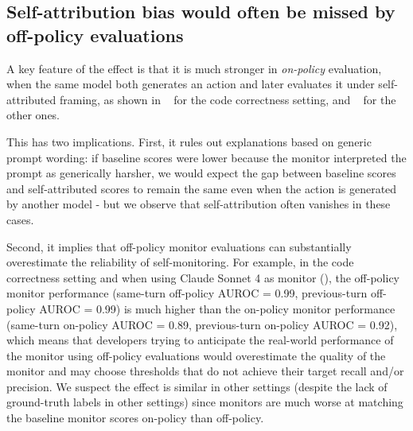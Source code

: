 \subsection{Self-attribution bias would often be missed by off-policy evaluations}

A key feature of the effect is that it is much stronger in \emph{on-policy} evaluation, when the same model both generates an action and later evaluates it under self-attributed framing, as shown in ~ for the code correctness setting, and ~ for the other ones.

This has two implications. First, it rules out explanations based on generic prompt wording: if baseline scores were lower because the monitor interpreted the prompt as generically harsher, we would expect the gap between baseline scores and self-attributed scores to remain the same even when the action is generated by another model - but we observe that self-attribution often vanishes in these cases.

Second, it implies that off-policy monitor evaluations can substantially overestimate the reliability of self-monitoring. For example, in the code correctness setting and when using Claude Sonnet 4 as monitor (), the off-policy monitor performance (same-turn off-policy AUROC = 0.99, previous-turn off-policy AUROC = 0.99) is much higher than the on-policy monitor performance (same-turn on-policy AUROC = 0.89, previous-turn on-policy AUROC = 0.92), which means that developers trying to anticipate the real-world performance of the monitor using off-policy evaluations would overestimate the quality of the monitor and may choose thresholds that do not achieve their target recall and/or precision. We suspect the effect is similar in other settings (despite the lack of ground-truth labels in other settings) since monitors are much worse at matching the baseline monitor scores on-policy than off-policy.


